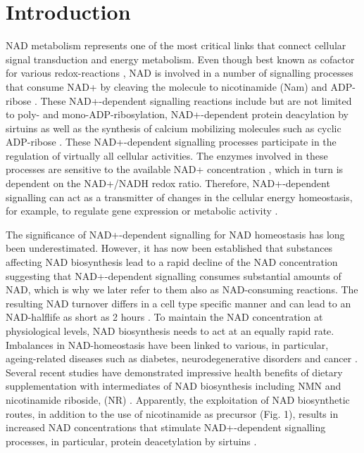 \section{Introduction}

NAD metabolism represents one of the most critical links that connect cellular signal transduction and energy metabolism. Even though best known as cofactor for various redox-reactions , NAD is involved in a number of signalling processes that consume NAD+ by cleaving the molecule to nicotinamide (Nam) and ADP-ribose \cite{Verdin2015}. These NAD+-dependent signalling reactions include but are not limited to poly- and mono-ADP-ribosylation, NAD+-dependent protein deacylation by sirtuins as well as the synthesis of calcium mobilizing molecules such as cyclic ADP-ribose \cite{?}. These NAD+-dependent signalling processes participate in the regulation of virtually all cellular activities. The enzymes involved in these processes are sensitive to the available NAD+ concentration \cite{Ruggieri2015}, which in turn is dependent on the NAD+/NADH redox ratio. Therefore, NAD+-dependent signalling can act as a transmitter of changes in the cellular energy homeostasis, for example, to regulate gene expression or metabolic activity \cite{Koch-Nolte2009}.

The significance of NAD+-dependent signalling for NAD homeostasis has long been underestimated. However, it has now been established that substances affecting NAD biosynthesis lead to a rapid decline of the NAD concentration \cite{Buonvicino2018} suggesting that NAD+-dependent signalling consumes substantial amounts of NAD, which is why we later refer to them also as NAD-consuming reactions. The resulting NAD turnover differs in a cell type specific manner and can lead to an NAD-halflife as short as 2 hours \cite{Liu2018}. To maintain the NAD concentration at physiological levels, NAD biosynthesis needs to act at an equally rapid rate. Imbalances in NAD-homeostasis have been linked to various, in particular, ageing-related diseases such as diabetes, neurodegenerative disorders and cancer \cite{Chiarugi2012,Verdin2015}. Several recent studies have demonstrated impressive health benefits of dietary supplementation with intermediates of NAD biosynthesis including NMN and nicotinamide riboside, (NR) \cite{Yoshino2018}. Apparently, the exploitation of NAD biosynthetic routes, in addition to the use of nicotinamide as precursor (Fig. 1), results in increased NAD concentrations that stimulate NAD+-dependent signalling processes, in particular, protein deacetylation by sirtuins \cite{North2004}.

